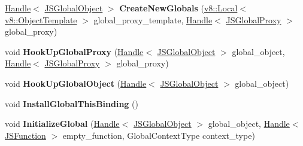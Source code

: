 \begin{DoxyCompactItemize}
\item 
\hyperlink{classv8_1_1internal_1_1_handle}{Handle}$<$ \hyperlink{classv8_1_1internal_1_1_j_s_global_object}{J\+S\+Global\+Object} $>$ {\bfseries Create\+New\+Globals} (\hyperlink{classv8_1_1_local}{v8\+::\+Local}$<$ \hyperlink{classv8_1_1_object_template}{v8\+::\+Object\+Template} $>$ global\+\_\+proxy\+\_\+template, \hyperlink{classv8_1_1internal_1_1_handle}{Handle}$<$ \hyperlink{classv8_1_1internal_1_1_j_s_global_proxy}{J\+S\+Global\+Proxy} $>$ global\+\_\+proxy)\hypertarget{classv8_1_1internal_1_1_b_a_s_e___e_m_b_e_d_d_e_d_a9cf017770873262bb4ed35c44c42da1a}{}\label{classv8_1_1internal_1_1_b_a_s_e___e_m_b_e_d_d_e_d_a9cf017770873262bb4ed35c44c42da1a}

\item 
void {\bfseries Hook\+Up\+Global\+Proxy} (\hyperlink{classv8_1_1internal_1_1_handle}{Handle}$<$ \hyperlink{classv8_1_1internal_1_1_j_s_global_object}{J\+S\+Global\+Object} $>$ global\+\_\+object, \hyperlink{classv8_1_1internal_1_1_handle}{Handle}$<$ \hyperlink{classv8_1_1internal_1_1_j_s_global_proxy}{J\+S\+Global\+Proxy} $>$ global\+\_\+proxy)\hypertarget{classv8_1_1internal_1_1_b_a_s_e___e_m_b_e_d_d_e_d_a18d3b4f044f2be2c1d3e9bd5182e4172}{}\label{classv8_1_1internal_1_1_b_a_s_e___e_m_b_e_d_d_e_d_a18d3b4f044f2be2c1d3e9bd5182e4172}

\item 
void {\bfseries Hook\+Up\+Global\+Object} (\hyperlink{classv8_1_1internal_1_1_handle}{Handle}$<$ \hyperlink{classv8_1_1internal_1_1_j_s_global_object}{J\+S\+Global\+Object} $>$ global\+\_\+object)\hypertarget{classv8_1_1internal_1_1_b_a_s_e___e_m_b_e_d_d_e_d_ac2a330a2ccfba69b64283cda9a651ef4}{}\label{classv8_1_1internal_1_1_b_a_s_e___e_m_b_e_d_d_e_d_ac2a330a2ccfba69b64283cda9a651ef4}

\item 
void {\bfseries Install\+Global\+This\+Binding} ()\hypertarget{classv8_1_1internal_1_1_b_a_s_e___e_m_b_e_d_d_e_d_a0d729ecf991376bb6e7db962f8ce0b26}{}\label{classv8_1_1internal_1_1_b_a_s_e___e_m_b_e_d_d_e_d_a0d729ecf991376bb6e7db962f8ce0b26}

\item 
void {\bfseries Initialize\+Global} (\hyperlink{classv8_1_1internal_1_1_handle}{Handle}$<$ \hyperlink{classv8_1_1internal_1_1_j_s_global_object}{J\+S\+Global\+Object} $>$ global\+\_\+object, \hyperlink{classv8_1_1internal_1_1_handle}{Handle}$<$ \hyperlink{classv8_1_1internal_1_1_j_s_function}{J\+S\+Function} $>$ empty\+\_\+function, Global\+Context\+Type context\+\_\+type)\hypertarget{classv8_1_1internal_1_1_b_a_s_e___e_m_b_e_d_d_e_d_a03e9f7b9ed2531f699c4debb7c89aafb}{}\label{classv8_1_1internal_1_1_b_a_s_e___e_m_b_e_d_d_e_d_a03e9f7b9ed2531f699c4debb7c89aafb}


\end{DoxyCompactItemize}
